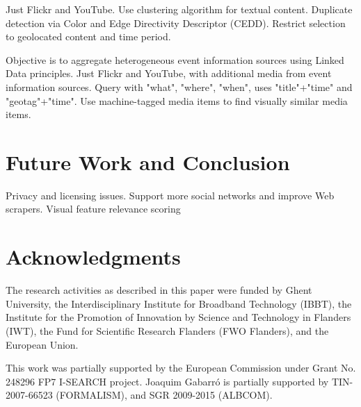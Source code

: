 \documentclass{acm_proc_article-sp}
\newcommand{\inlinelistingsize}{\fontsize{8pt}{11pt}}
\let\oldttdefault\ttdefault
\renewcommand{\ttdefault}{pcr}
\let\oldurl\url
\renewcommand{\url}[1]{\inlinelistingsize\oldurl{#1}}
\begin{document}
\cite{Fabro2012}
Just Flickr and YouTube.
Use clustering algorithm for textual content.
Duplicate detection via Color and Edge Directivity Descriptor (CEDD).
Restrict selection to geolocated content and time period.

\cite{Liu2011}
Objective is to aggregate heterogeneous event information sources using Linked Data principles.
Just Flickr and YouTube, with additional media from event information sources.
Query with "what", "where", "when", uses "title"+"time" and "geotag"+"time".
Use machine-tagged media items to find visually similar media items.

\section{Future Work and Conclusion}
Privacy and licensing issues.
Support more social networks and improve Web scrapers.
Visual feature relevance scoring

\section*{Acknowledgments}
The research activities as described in this paper were funded by Ghent University, the Interdisciplinary Institute for Broadband Technology (IBBT), the Institute for the Promotion of Innovation by Science and Technology in Flanders (IWT), the Fund for Scientific Research Flanders (FWO Flanders), and the European Union.

This work was partially supported by the European Commission under Grant No. 248296 FP7 \mbox{I-SEARCH} project.
Joaquim Gabarr\'o is partially supported by TIN-2007-66523 (FORMALISM), and SGR 2009-2015 (\mbox{ALBCOM}).

\let\ttdefault\oldttdefault
\let\url\oldurl




\balancecolumns
\end{document}
